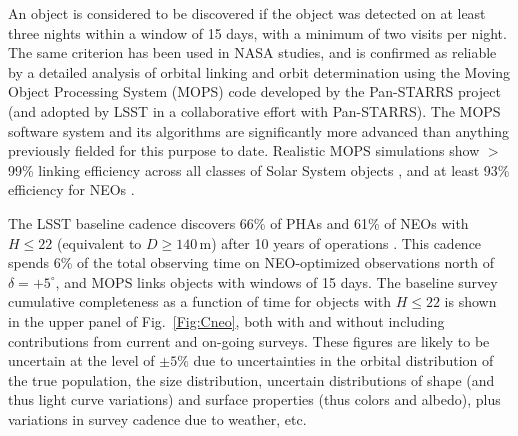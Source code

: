 An object is considered to be discovered if the object was detected on at least three nights within a
window of 15 days, with a minimum of two visits per night. The same criterion has been used in NASA studies,
and is confirmed as reliable by a detailed analysis of orbital linking and orbit determination using the Moving
Object Processing System (MOPS) code \citep{2017AJ....154...12V,2017AJ....154...13V,2005AAS...20712102J} developed by the
Pan-STARRS project (and adopted by LSST in a collaborative effort with Pan-STARRS). The MOPS software
system and its algorithms are significantly more advanced than anything previously
fielded for this purpose to date. Realistic MOPS simulations show
$>$99\% linking efficiency across all classes of Solar System objects \citep{2013PASP..125..357D},
and at least 93\% efficiency for NEOs \citep{2017AJ....154...12V,2017AJ....154...13V}.

The LSST baseline cadence discovers 66\% of PHAs and 61\% of NEOs with $H\leq22$ (equivalent to $D\ge140$\,m)
after 10 years of operations \citep{2018Icar..303..181J}.  This cadence spends 6\% of the total
observing time on NEO-optimized observations north of $\delta = +5^\circ$, and MOPS links objects with windows of 15 days.
The baseline survey cumulative completeness as a function of time for objects with $H\le22$ is shown in the upper panel of Fig.~\ref{Fig:Cneo},
both with and without including contributions from current and
on-going surveys. These figures are likely to be uncertain at the level of $\pm5\%$ due
to uncertainties in the orbital distribution of the true population, the size distribution, uncertain distributions of shape
(and thus light curve variations) and surface properties (thus colors and albedo), plus variations in survey cadence due to
weather, etc.

